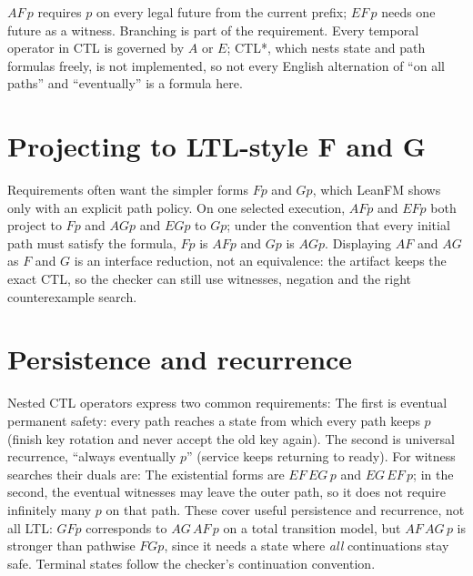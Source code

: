 $AF\,p$ requires $p$ on every legal future from the current prefix; $EF\,p$ needs
one future as a witness. Branching is part of the requirement. Every temporal
operator in CTL is governed by $A$ or $E$; CTL*, which nests state and path
formulas freely, is not implemented, so not every English alternation of ``on all
paths'' and ``eventually'' is a formula here.

\section{Projecting to LTL-style F and G}

Requirements often want the simpler forms $F p$ and $G p$, which LeanFM shows only
with an explicit path policy. On one selected execution, $AF p$ and $EF p$ both
project to $F p$ and $AG p$ and $EG p$ to $G p$; under the convention that every
initial path must satisfy the formula, $F p$ is $AF p$ and $G p$ is $AG p$.
Displaying $AF$ and $AG$ as $F$ and $G$ is an interface reduction, not an
equivalence: the artifact keeps the exact CTL, so the checker can still use
witnesses, negation and the right counterexample search.

\section{Persistence and recurrence}

Nested CTL operators express two common requirements:
The first is eventual permanent safety: every path reaches a state from which
every path keeps $p$ (finish key rotation and never accept the old key again). The
second is universal recurrence, ``always eventually $p$'' (service keeps returning
to ready). For witness searches their duals are:
The existential forms are $EF\,EG\,p$ and $EG\,EF\,p$; in the second, the eventual
witnesses may leave the outer path, so it does not require infinitely many $p$ on
that path. These cover useful persistence and recurrence, not all LTL: $G F p$
corresponds to $AG\,AF\,p$ on a total transition model, but $AF\,AG\,p$ is
stronger than pathwise $F G p$, since it needs a state where \emph{all}
continuations stay safe. Terminal states follow the checker's continuation
convention.


